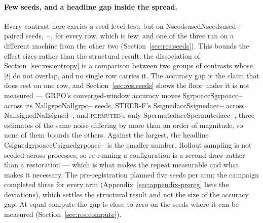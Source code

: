 \documentclass[11pt]{article}
\providecommand{\PENDING}{\textcolor{red}{\textbf{--}}}
\newcommand{\num}[1]{\ifcsname #1\endcsname\csname #1\endcsname\else\PENDING\fi}
\begin{document}
\paragraph{Few seeds, and a headline gap inside the spread.}
Every contrast here carries a seed-level test, but on \num{Nseedsused} paired
seeds, $\num{Seedset}$, for every row, which is few; and one of the three ran on a
different machine from the other two (Section~\ref{sec:res:seeds}). This bounds the effect sizes rather than the
structural result: the dissociation of Section~\ref{sec:res:entropy} is a comparison
between two groups of contrasts whose $|t|$ do not overlap, and no single row carries
it. The accuracy gap is the claim that does rest on one row, and
Section~\ref{sec:res:seeds} shows the floor under it is not measured --- GRPO's
converged-window accuracy moves \num{Sgrpoacc} across its \num{Nallgrpo} seeds,
STEER-F's \num{Ssignedacc} across \num{Nallsigned}, and \textsc{permuted}'s only
\num{Spermutedacc}, three estimates of the same noise differing by more than an order
of magnitude, so none of them bounds the others. Against the largest, the headline
\num{Csignedgrpoacc} is the smaller number. Rollout sampling is not seeded across
processes, so re-running a configuration is a second draw rather than a restoration
--- which is what makes the repeat measurable and what makes it necessary. The
pre-registration planned five seeds per arm; the campaign completed three for every
arm (Appendix~\ref{sec:appendix-prereg} lists the deviations), which settles the
structural result and not the size of the accuracy gap. At equal compute the gap is
close to zero on the seeds where it can be measured (Section~\ref{sec:res:compute}).
\end{document}
